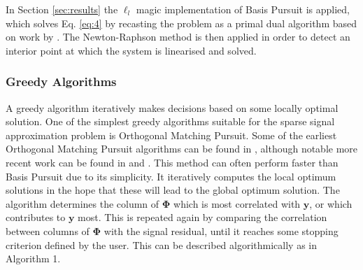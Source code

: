 \documentclass[conference]{IEEEtran}
\begin{document}
In Section \ref{sec:results} the $\ell_l$ magic \cite{Candes2005} implementation of Basis Pursuit is applied, which solves Eq. \eqref{eq:4} by recasting the problem as a primal dual algorithm based on work by \cite{boyd2004convex}. The Newton-Raphson method is then applied in order to detect an interior point at which the system is linearised and solved. 
\subsubsection{Greedy Algorithms}
\label{sec:greedy-algorithm}
A greedy algorithm iteratively makes decisions based on some locally optimal solution. One of the simplest greedy algorithms suitable for the sparse signal approximation problem is Orthogonal Matching Pursuit. Some of the earliest Orthogonal Matching Pursuit algorithms can be found in \cite{pati1993, davis1997}, although notable more recent work can be found in  \cite{tropp2004} and \cite{tropp2007}. This method can often perform faster than Basis Pursuit due to its simplicity. It iteratively computes the local optimum solutions in the hope that these will lead to the global optimum solution. The algorithm determines the column of $\boldsymbol{\Phi}$ which is most correlated with $\boldsymbol{y}$, or which contributes to $\boldsymbol{y}$ most. This is repeated again by comparing the correlation between columns of $\boldsymbol{\Phi}$ with the signal residual, until it reaches some stopping criterion defined by the user.  This can be described algorithmically as in Algorithm 1.  

\end{document}
